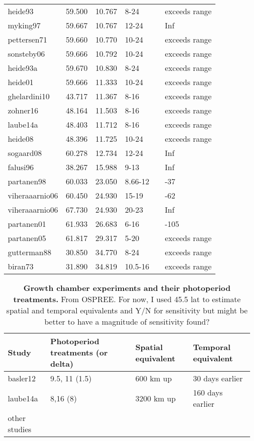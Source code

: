 \documentclass{article}
\begin{document}
\begin{table}[ht]
\begin{tabular}{|p{}|p{}|p{}|p{}|p{}|p{}|}
  heide93 & 59.500 & 10.767 & 8-24 &  & exceeds range \\ 
  myking97 & 59.667 & 10.767 & 12-24 &  & Inf \\ 
  pettersen71 & 59.660 & 10.770 & 10-24 &  & exceeds range \\ 
  sonsteby06 & 59.666 & 10.792 & 10-24 &  & exceeds range \\ 
  heide93a & 59.670 & 10.830 & 8-24 &  & exceeds range \\ 
  heide01 & 59.666 & 11.333 & 10-24 &  & exceeds range \\ 
  ghelardini10 & 43.717 & 11.367 & 8-16 &  & exceeds range \\ 
  zohner16 & 48.164 & 11.503 & 8-16 &  & exceeds range \\ 
  laube14a & 48.403 & 11.712 & 8-16 &  & exceeds range \\ 
  heide08 & 48.396 & 11.725 & 10-24 &  & exceeds range \\ 
  sogaard08 & 60.278 & 12.734 & 12-24 &  & Inf \\ 
  falusi96 & 38.267 & 15.988 & 9-13 &  & Inf \\ 
  partanen98 & 60.033 & 23.050 & 8.66-12 &  & -37 \\ 
  viheraaarnio06 & 60.450 & 24.930 & 15-19 &  & -62 \\ 
  viheraaarnio06 & 67.730 & 24.930 & 20-23 &  & Inf \\ 
  partanen01 & 61.933 & 26.683 & 6-16 &  & -105 \\ 
  partanen05 & 61.817 & 29.317 & 5-20 &  & exceeds range \\ 
  gutterman88 & 30.850 & 34.770 & 8-24 &  & exceeds range \\ 
  biran73 & 31.890 & 34.819 & 10.5-16 &  & exceeds range \\ 
   \hline
\end{tabular}
\end{table}\clearpage
\begin{table}[p]
  \caption{\textbf{Growth chamber experiments and their photoperiod treatments.} From OSPREE. For now, I used 45.5 lat to estimate spatial and temporal equivalents and Y/N for sensitivity but might be better to have a magnitude of sensitivity found?}
\begin{footnotesize} 
   \begin{tabular}{| p{1cm} | p{3.8cm} | p{2.9 cm} | p{3.2 cm} |}
    \hline
  \bf{Study} & \bf{Photoperiod treatments (or delta)} & \bf{Spatial equivalent} & \bf{Temporal equivalent}\\ \hline
    basler12 & 9.5, 11 (1.5) &  600 km up & 30 days earlier \\ \hline
    laube14a & 8,16 (8) &  3200 km up & 160 days earlier \\ \hline
    other studies &  &   & \\ \hline

     \end{tabular}    
\end{footnotesize} 
    \end{table}
\clearpage
\end{document}
